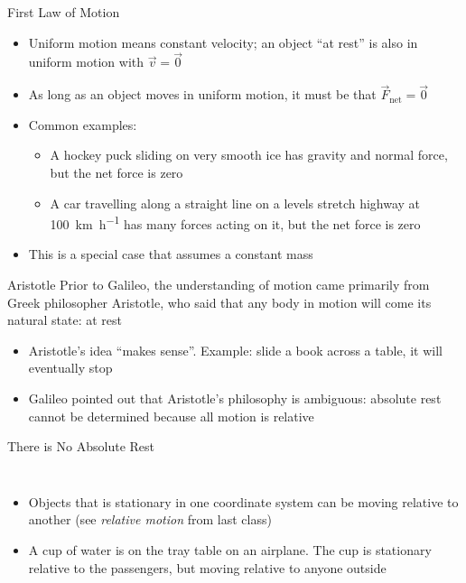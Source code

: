 \documentclass[12pt,compress,aspectratio=169]{beamer}
\begin{document}
\begin{frame}{First Law of Motion}
  \begin{itemize}
  \item Uniform motion means constant velocity; an object ``at rest'' is also
    in uniform motion with $\vec v=\vec 0$
  \item As long as an object moves in uniform motion, it must be that
    $\vec F_\text{net}=\vec 0$
  \item Common examples:
    \begin{itemize}
    \item A hockey puck sliding on very smooth ice has gravity and normal
      force, but the net force is zero
    \item A car travelling along a straight line on a levels stretch highway at
      \SI{100}{\kilo\metre\per\hour} has many forces acting on it, but the net
      force is zero 
    \end{itemize}
  \item{\color{red!80!black}This is a special case that assumes a constant
    mass}
  \end{itemize}
\end{frame}



\begin{frame}{Aristotle}
  Prior to Galileo, the understanding of motion came primarily from Greek
  philosopher Aristotle, who said that any body in motion will come its
  natural state: at rest
  \begin{itemize}
  \item Aristotle's idea ``makes sense''. Example: slide a book across a table,
    it will eventually stop
  \item Galileo pointed out that Aristotle's philosophy is ambiguous: absolute
    rest cannot be determined because all motion is relative
  \end{itemize}
\end{frame}



\begin{frame}{There is No Absolute Rest}
  \begin{center}
  \end{center}
  \begin{columns}
    
    \vspace{-.3in}
    \begin{itemize}
    \item Objects that is stationary in one coordinate system can be moving
      relative to another (see \emph{relative motion} from last class)
    \item A cup of water is on the tray table on an airplane. The cup is
      stationary relative to the passengers, but moving relative to anyone
      outside
    \end{itemize}
  \end{columns}
\end{frame}
\end{document}
